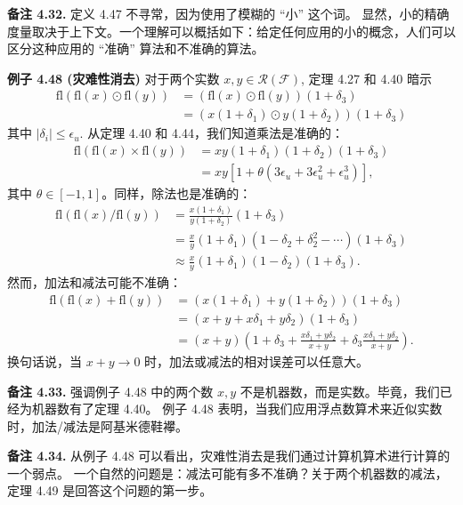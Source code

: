 \documentclass[a4paper]{ctexart}
\begin{document}
{\noindent \textbf{备注 4.32.} 定义 4.47 不寻常，因为使用了模糊的 ``小'' 这个词。
显然，小的精确度量取决于上下文。一个理解可以概括如下：给定任何应用的小的概念，人们可以区分这种应用的 ``准确'' 算法和不准确的算法。

\noindent \textbf{例子 4.48 (灾难性消去) } 对于两个实数 $x, y \in \mathcal{R}(\mathcal{F})$, 定理 4.27 和 4.40 暗示
\begin{align*}
  \text{fl}(\text{fl}(x) \odot \text{fl}(y)) &= (\text{fl}(x) \odot \text{fl}(y))(1 + \delta_3) \\
  &= (x(1 + \delta_1) \odot y(1 + \delta_2))(1 + \delta_3)
\end{align*}
其中 $|\delta_i| \leq \epsilon_u$. 从定理 4.40 和 4.44，我们知道乘法是准确的：
\begin{align*}
\text{fl}(\text{fl}(x) \times \text{fl}(y)) &= xy(1 + \delta_1)(1 + \delta_2)(1 + \delta_3) \\
  &= xy[1 + \theta(3\epsilon_u + 3\epsilon_u^2 + \epsilon_u^3)],
\end{align*}
其中 $\theta \in [-1, 1]$。同样，除法也是准确的：
\begin{align*}
\text{fl}(\text{fl}(x) / \text{fl}(y)) &= \frac{x(1 + \delta_1)}{y(1 + \delta_2)}(1 + \delta_3) \\
  &= \frac{x}{y}(1 + \delta_1)(1 - \delta_2 + \delta_2^2 - \cdots)(1 + \delta_3) \\
  &\approx \frac{x}{y}(1 + \delta_1)(1 - \delta_2)(1 + \delta_3).
\end{align*}
然而，加法和减法可能不准确：
\begin{align*}
  \text{fl}(\text{fl}(x) + \text{fl}(y)) &= (x(1 + \delta_1) + y(1 + \delta_2))(1 + \delta_3) \\
  &= (x + y + x\delta_1 + y\delta_2)(1 + \delta_3) \\
  &= (x + y)\left(1 + \delta_3 + \frac{x\delta_1 + y\delta_2}{x + y} + \delta_3 \frac{x\delta_1 + y\delta_2}{x + y}\right).
\end{align*}
换句话说，当 $x + y \rightarrow 0$ 时，加法或减法的相对误差可以任意大。

\noindent \textbf{备注 4.33.} 强调例子 4.48 中的两个数 $x, y$ 不是机器数，而是实数。毕竟，我们已经为机器数有了定理 4.40。
例子 4.48 表明，当我们应用浮点数算术来近似实数时，加法/减法是阿基米德鞋襻。

\noindent \textbf{备注 4.34.} 从例子 4.48 可以看出，灾难性消去是我们通过计算机算术进行计算的一个弱点。
一个自然的问题是：减法可能有多不准确？关于两个机器数的减法，定理 4.49 是回答这个问题的第一步。

}
\end{document}
